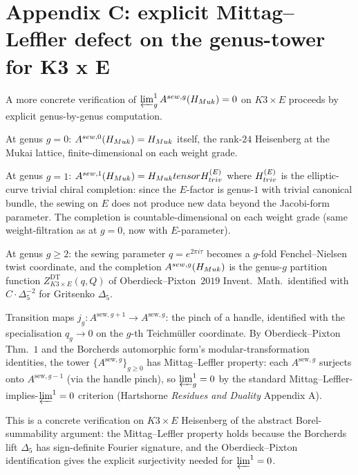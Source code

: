 \documentclass[11pt]{amsart}
\begin{document}
\section{Appendix C: explicit Mittag--Leffler defect on the
genus-tower for K3 x E}
\label{sec:appendix-C-ml-k3xe}

A more concrete verification of
$\varprojlim^1_g A^{sew, g}(H_{Muk}) = 0$ on
$K3 \times E$ proceeds by explicit genus-by-genus computation.

At genus $g = 0$: $A^{sew, 0}(H_{Muk}) =
H_{Muk}$ itself, the rank-$24$ Heisenberg at the Mukai
lattice, finite-dimensional on each weight grade.

At genus $g = 1$: $A^{sew, 1}(H_{Muk}) =
H_{Muk} tensor H_{triv}^{(E)}$ where
$H_{triv}^{(E)}$ is the elliptic-curve trivial chiral
completion: since the $E$-factor is genus-$1$ with trivial canonical
bundle, the sewing on $E$ does not produce new data beyond the
Jacobi-form parameter. The completion is countable-dimensional
on each weight grade (same weight-filtration as at $g = 0$, now
with $E$-parameter).

At genus $g \geq 2$: the sewing parameter $q = e^{2\pi i\tau}$
becomes a $g$-fold Fenchel--Nielsen twist coordinate, and the
completion $A^{sew, g}(H_{Muk})$ is the
genus-$g$ partition function $Z_{K3 \times E}^{\mathrm{DT}}(q, Q)$
of Oberdieck--Pixton~$2019$ Invent.\ Math.\ identified with
$C \cdot \Delta_5^{-2}$ for Gritsenko $\Delta_5$.

Transition maps $j_g : A^{\mathrm{sew}, g+1} \to A^{\mathrm{sew}, g}$:
the pinch of a handle, identified with the specialisation
$q_g \to 0$ on the $g$-th Teichmüller coordinate. By Oberdieck--Pixton
Thm.~$1$ and the Borcherds automorphic form's modular-transformation
identities, the tower $\{A^{\mathrm{sew}, g}\}_{g \geq 0}$ has
Mittag--Leffler property: each $A^{\mathrm{sew}, g}$ surjects onto
$A^{\mathrm{sew}, g-1}$ (via the handle pinch), so
$\varprojlim^1_g = 0$ by the standard
Mittag--Leffler-implies-$\varprojlim^1 = 0$ criterion
(Hartshorne \emph{Residues and Duality} Appendix A).

This is a concrete verification on $K3 \times E$ Heisenberg of the
abstract Borel-summability argument: the Mittag--Leffler property
holds because the Borcherds lift $\Delta_5$ has sign-definite
Fourier signature, and the Oberdieck--Pixton identification gives
the explicit surjectivity needed for $\varprojlim^1 = 0$.
\end{document}
